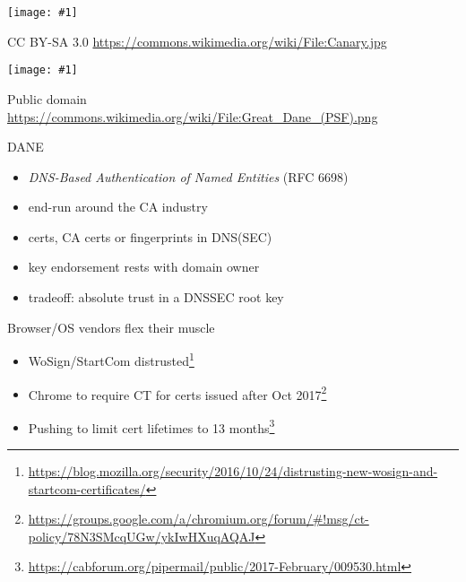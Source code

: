 \documentclass[ignorenonframetext,aspectratio=169]{beamer}
\makeatletter
\def\maxwidth{\ifdim\Gin@nat@width>\linewidth\linewidth\else\Gin@nat@width\fi}
\def\maxheight{\ifdim\Gin@nat@height>\textheight0.8\textheight\else\Gin@nat@height\fi}
\newcommand{\includegraphicsscaled}[1]{
    \texttt{[image: \#1]}
}
\makeatother
\begin{document}
\begin{frame}[plain]

\begin{center}
\includegraphicsscaled{Canary.jpg}
\end{center}

\tiny

CC BY-SA 3.0 \url{https://commons.wikimedia.org/wiki/File:Canary.jpg}

\end{frame}

\begin{frame}[plain]

\begin{center}
\includegraphicsscaled{Great_Dane_(PSF).png}
\end{center}

\tiny

Public domain \url{https://commons.wikimedia.org/wiki/File:Great_Dane_(PSF).png}

\end{frame}

\begin{frame}{DANE}

\begin{itemize}
\item
  \emph{DNS-Based Authentication of Named Entities} (RFC 6698)
\item
  end-run around the CA industry
\item
  certs, CA certs or fingerprints in DNS(SEC)
\item
  key endorsement rests with domain owner
\item
  tradeoff: absolute trust in a DNSSEC root key
\end{itemize}

\end{frame}

\begin{frame}{Browser/OS vendors flex their muscle}

\begin{itemize}
\item WoSign/StartCom distrusted\footnote[frame]{
  \url{https://blog.mozilla.org/security/2016/10/24/distrusting-new-wosign-and-startcom-certificates/}}
\item Chrome to require CT for certs issued after Oct 2017\footnote[frame]{
  \url{https://groups.google.com/a/chromium.org/forum/\#!msg/ct-policy/78N3SMcqUGw/ykIwHXuqAQAJ}}
\item Pushing to limit cert lifetimes to 13 months\footnote{
  \url{https://cabforum.org/pipermail/public/2017-February/009530.html}}
\end{itemize}

\end{frame}
\end{document}
